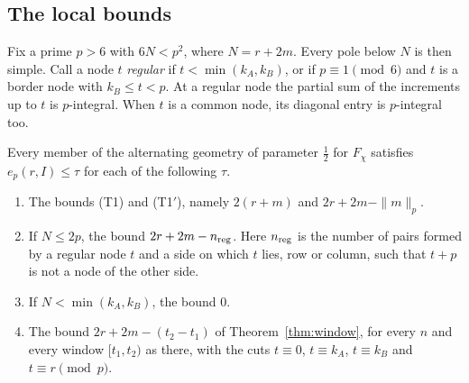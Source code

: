 \subsection{The local bounds}
Fix a prime $p>6$ with $6N<p^2$, where $N=r+2m$. Every pole below $N$ is then simple. Call a node $t$ \emph{regular} if
$t<\min(k_A,k_B)$, or if $p\equiv1\pmod6$ and $t$ is a border node with $k_B\le t<p$. At a regular node the partial sum
of the increments up to $t$ is $p$-integral. When $t$ is a common node, its diagonal entry is $p$-integral too.

\begin{proposition}\label{prop:chi3-local}
Every member of the alternating geometry of parameter $\frac12$ for $F_\chi$ satisfies $e_p(r,I)\le\tau$ for each of the
following $\tau$.
\begin{enumerate}[label=(\roman*),leftmargin=*]
\item The bounds (T1) and (T1$'$), namely $2(r+m)$ and $2r+2m-\|m\|_p$.
\item If $N\le2p$, the bound $2r+2m-n_{\rm reg}$. Here $n_{\rm reg}$ is the number of pairs formed by a regular node $t$
 and a side on which $t$ lies, row or column, such that $t+p$ is not a node of the other side.
\item If $N<\min(k_A,k_B)$, the bound $0$.
\item The bound $2r+2m-(t_2-t_1)$ of Theorem~\ref{thm:window}, for every $n$ and every window $[t_1,t_2)$ as there, with
 the cuts $t\equiv0$, $t\equiv k_A$, $t\equiv k_B$ and $t\equiv r\pmod p$.
\end{enumerate}
\end{proposition}

